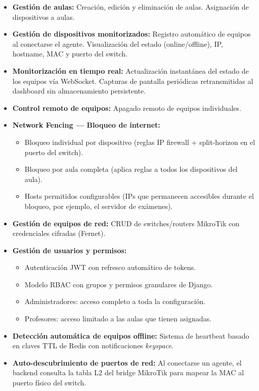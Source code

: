 \documentclass[12pt, a4paper, twoside]{article}
\begin{document}
\begin{itemize}
  \item \textbf{Gestión de aulas:} Creación, edición y eliminación de aulas. Asignación de dispositivos a aulas.
  \item \textbf{Gestión de dispositivos monitorizados:} Registro automático de equipos al conectarse el agente. Visualización del estado (online/offline), IP, hostname, MAC y puerto del switch.
  \item \textbf{Monitorización en tiempo real:} Actualización instantánea del estado de los equipos vía WebSocket. Capturas de pantalla periódicas retransmitidas al dashboard sin almacenamiento persistente.
  \item \textbf{Control remoto de equipos:} Apagado remoto de equipos individuales.
  \item \textbf{Network Fencing — Bloqueo de internet:}
  \begin{itemize}
    \item Bloqueo individual por dispositivo (reglas IP firewall + split-horizon en el puerto del switch).
    \item Bloqueo por aula completa (aplica reglas a todos los dispositivos del aula).
    \item Hosts permitidos configurables (IPs que permanecen accesibles durante el bloqueo, por ejemplo, el servidor de exámenes).
  \end{itemize}
  \item \textbf{Gestión de equipos de red:} CRUD de switches/routers MikroTik con credenciales cifradas (Fernet).
  \item \textbf{Gestión de usuarios y permisos:}
  \begin{itemize}
    \item Autenticación JWT con refresco automático de tokens.
    \item Modelo RBAC con grupos y permisos granulares de Django.
    \item Administradores: acceso completo a toda la configuración.
    \item Profesores: acceso limitado a las aulas que tienen asignadas.
  \end{itemize}
  \item \textbf{Detección automática de equipos offline:} Sistema de heartbeat basado en claves TTL de Redis con notificaciones \textit{keyspace}.
  \item \textbf{Auto-descubrimiento de puertos de red:} Al conectarse un agente, el backend consulta la tabla L2 del bridge MikroTik para mapear la MAC al puerto físico del switch.
\end{itemize}
\end{document}
